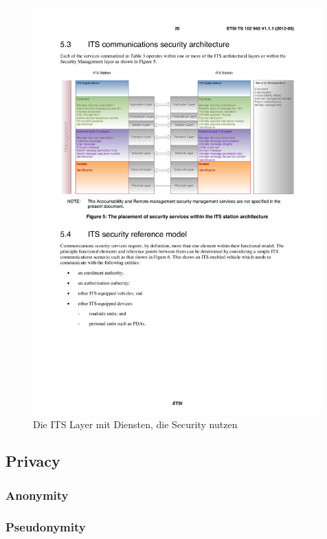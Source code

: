 \begin{figure}
	\includegraphics[width=0.99\textwidth]{content/images/02_architektur/securityDienste.pdf}
	\caption{Die ITS Layer mit Diensten, die Security nutzen \cite{ts102940}}
	\label{fig:architektur_securityDienste}
\end{figure}

\subsection{Privacy}
\subsubsection{Anonymity}
\subsubsection{Pseudonymity}
